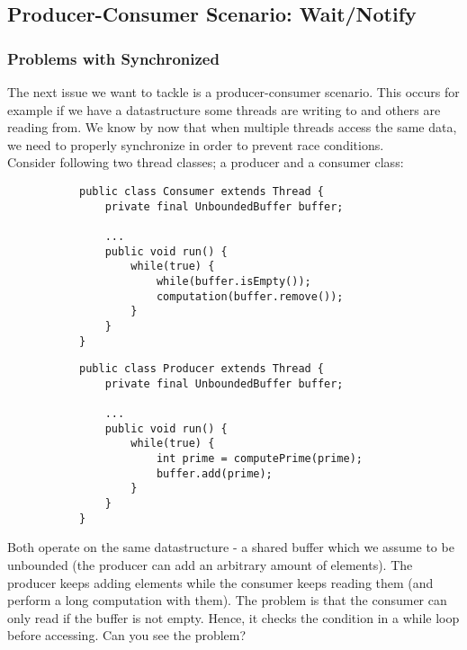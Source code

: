 \documentclass[main.tex]{subfiles}
\begin{document}
\subsection{Producer-Consumer Scenario: Wait/Notify}
\subsubsection{Problems with Synchronized}
The next issue we want to tackle is a producer-consumer scenario. This occurs for example if we have a datastructure some threads are writing to and others are reading from. We know by now that when multiple threads access the same data, we need to properly synchronize in order to prevent race conditions.\\[3mm]
Consider following two thread classes; a producer and a consumer class:
    \begin{figure}[H]
        \begin{subfigure}{.52\textwidth}
            \begin{verbatim}
public class Consumer extends Thread {
    private final UnboundedBuffer buffer;

    ...
    public void run() {
        while(true) {
            while(buffer.isEmpty());
            computation(buffer.remove());
        }
    }
}
            \end{verbatim}
        \end{subfigure}%
        \begin{subfigure}{.52\textwidth}
            \begin{verbatim}
public class Producer extends Thread {
    private final UnboundedBuffer buffer;

    ...
    public void run() {
        while(true) {
            int prime = computePrime(prime);
            buffer.add(prime);
        }
    }
}
            \end{verbatim}
        \end{subfigure}
    \end{figure}
Both operate on the same datastructure - a shared buffer which we assume to be unbounded (the producer can add an arbitrary amount of elements). The producer keeps adding elements while the consumer keeps reading them (and perform a long computation with them). The problem is that the consumer can only read if the buffer is not empty. Hence, it checks the condition in a while loop before accessing. Can you see the problem?\\[3mm]

\end{document}
